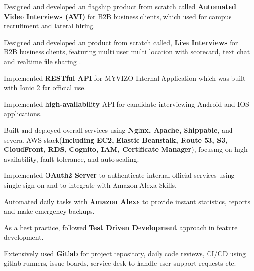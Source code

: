 \begin{cventries}
{\begin{cvitems}
        \item {Designed and developed an flagship product from scratch called \textbf{Automated Video Interviews (AVI)} for B2B business clients, which used for campus recruitment and lateral hiring.}
        \item {Designed and developed an product from scratch called, \textbf{ Live Interviews} for B2B business clients, featuring multi user multi location with scorecard, text chat and realtime file sharing .}
        \item {Implemented \textbf{RESTful API} for MYVIZO Internal Application which was built with Ionic 2 for official use.}
        \item {Implemented \textbf{high-availability} API for candidate interviewing Android and IOS applications.}
        \item {Built and deployed overall services using \textbf{Nginx, Apache, Shippable}, and several AWS stack(\textbf{Including EC2, Elastic Beanstalk, Route 53, S3, CloudFront, RDS, Cognito, IAM, Certificate Manager}), focusing on high-availability, fault tolerance, and auto-scaling.}
        \item {Implemented \textbf{OAuth2 Server} to authenticate internal official services using single sign-on and to integrate with Amazon Alexa Skills.}
        \item {Automated daily tasks with \textbf{Amazon Alexa} to provide instant statistics, reports and make emergency backups.}
        \item {As a best practice, followed \textbf{Test Driven Development} approach in feature development.}
        \item {Extensively used \textbf{Gitlab} for project repository, daily code reviews, CI/CD using gitlab runners, issue boards, service desk to handle user support requests etc. }
      \end{cvitems}
    }


\end{cventries}
